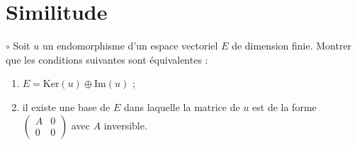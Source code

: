 \documentclass[french,a4paper]{article}
\renewcommand{\ker}{\text{Ker}}
\theoremstyle{plain}
\theoremstyle{definition}
\theoremstyle{remark}
\begin{document}
\section{Similitude}

\begin{ex}{$\circ$}
	Soit $u$ un endomorphisme d'un espace vectoriel $E$ de dimension finie. Montrer que les conditions suivantes sont équivalentes :
	\begin{enumerate}[label=(\roman*)]
		\item $E=\ker(u)\oplus\text{Im}(u)$ ;
		\item il existe une base de $E$ dans laquelle la matrice de $u$ est de la forme $\displaystyle\begin{pmatrix}
			A&0\\
			0&0
		\end{pmatrix}$ avec $A$ inversible.
	\end{enumerate}
\end{ex}
\end{document}
